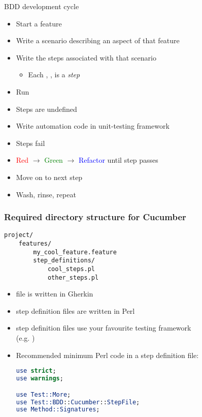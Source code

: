 \documentclass[10pt]{vcs_beamer}
\newcommand{\Given}{\color{DarkOrange}{Given}}
\newcommand{\When}{\color{RoyalBlue}{When}}
\newcommand{\Then}{\color{ForestGreen}{Then}}
\begin{document}
\begin{frame}{BDD development cycle}
    \begin{itemize}
        \item Start a feature
        \item Write a scenario describing an aspect of that feature
        \item Write the steps associated with that scenario
            \begin{itemize}
                \item Each \ttt{\Given}, \ttt{\When}, \ttt{\Then} is a \emph{step}
            \end{itemize}
        \item Run 
        \item Steps are undefined
        \item Write automation code in unit-testing framework
        \item Steps fail
        \item \textcolor{red}{Red} $\rightarrow$ \textcolor{green}{Green}
            $\rightarrow$ \textcolor{blue}{Refactor} until step passes
        \item Move on to next step
        \item Wash, rinse, repeat
    \end{itemize}
\end{frame}

\begin{frame}[fragile]
\frametitle{Required directory structure for Cucumber}

\begin{lstlisting}
project/
    features/
        my_cool_feature.feature
        step_definitions/
            cool_steps.pl
            other_steps.pl
\end{lstlisting}

\begin{itemize}
    \item {} file is written in Gherkin
    \item step definition files are written in Perl
    \item step definition files use your favourite testing framework\\
        (e.g. )
    \item Recommended minimum Perl code in a step definition file:
\begin{lstlisting}[language=perl]
use strict;
use warnings;

use Test::More;
use Test::BDD::Cucumber::StepFile;
use Method::Signatures;
\end{lstlisting}
\end{itemize}

\end{frame}
\end{document}
